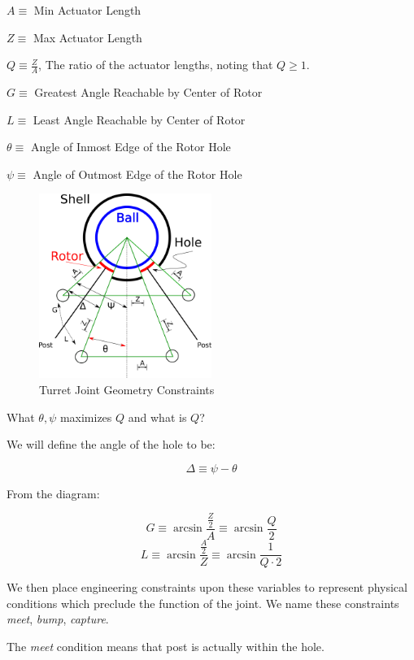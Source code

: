 \documentclass[12pt]{article}
\begin{document}
$ A \equiv $ Min Actuator Length

$ Z \equiv $ Max Actuator Length

$ Q \equiv \frac{Z}{A} $,  The ratio of the actuator lengths, noting that $Q \geq 1$.

$ G \equiv $ Greatest Angle Reachable by Center of Rotor

$ L \equiv $ Least Angle Reachable by Center of Rotor

$ \theta \equiv $ Angle of Inmost Edge of the Rotor Hole

$ \psi \equiv $ Angle of Outmost Edge of the Rotor Hole

\begin{figure}[!ht]
  \centering
    \includegraphics[width=0.5\textwidth]{ConstraintDrawing.png}
    \caption[Constraints]{Turret Joint Geometry Constraints}
      \label{constraint-drawing}
\end{figure}

\bigskip

What $\theta, \psi$ maximizes $Q$ and what is $Q$?

\bigskip

We will define the angle of the hole to be:

\[ \Delta \equiv \psi - \theta \]

From the diagram:

\[
G \equiv \arcsin{ \frac{\frac{Z}{2}}{A}} \equiv \arcsin{\frac{Q}{2}}
\]
\[
L \equiv \arcsin{ \frac{\frac{A}{2}}{Z}} \equiv \arcsin{\frac{1}{Q \cdot 2}}
\]

We then place engineering constraints upon these variables to represent physical conditions
which preclude the function of the joint.
We name these constraints \textit{meet}, \textit{bump}, \textit{capture}.

The \textit{meet} condition means that post is actually within the hole.
\end{document}

